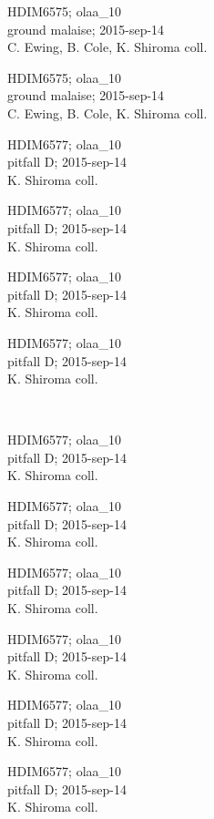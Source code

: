 \documentclass[2pt]{extarticle}
\begin{document}
\noindent
\parbox{0.16\textwidth}{\tiny \raggedright \rule[-0.3\baselineskip]{0pt}{10pt}HDIM6575; olaa\_10\\ ground malaise; 2015-sep-14\\ C. Ewing, B. Cole, K. Shiroma coll.}
\parbox{0.16\textwidth}{\tiny \raggedright \rule[-0.3\baselineskip]{0pt}{10pt}HDIM6575; olaa\_10\\ ground malaise; 2015-sep-14\\ C. Ewing, B. Cole, K. Shiroma coll.}
\parbox{0.16\textwidth}{\tiny \raggedright \rule[-0.3\baselineskip]{0pt}{10pt}HDIM6577; olaa\_10\\ pitfall D; 2015-sep-14\\ K. Shiroma coll.}
\parbox{0.16\textwidth}{\tiny \raggedright \rule[-0.3\baselineskip]{0pt}{10pt}HDIM6577; olaa\_10\\ pitfall D; 2015-sep-14\\ K. Shiroma coll.}
\parbox{0.16\textwidth}{\tiny \raggedright \rule[-0.3\baselineskip]{0pt}{10pt}HDIM6577; olaa\_10\\ pitfall D; 2015-sep-14\\ K. Shiroma coll.}
\parbox{0.16\textwidth}{\tiny \raggedright \rule[-0.3\baselineskip]{0pt}{10pt}HDIM6577; olaa\_10\\ pitfall D; 2015-sep-14\\ K. Shiroma coll.} \\ 
\vspace{0.001in} 

\noindent
\parbox{0.16\textwidth}{\tiny \raggedright \rule[-0.3\baselineskip]{0pt}{10pt}HDIM6577; olaa\_10\\ pitfall D; 2015-sep-14\\ K. Shiroma coll.}
\parbox{0.16\textwidth}{\tiny \raggedright \rule[-0.3\baselineskip]{0pt}{10pt}HDIM6577; olaa\_10\\ pitfall D; 2015-sep-14\\ K. Shiroma coll.}
\parbox{0.16\textwidth}{\tiny \raggedright \rule[-0.3\baselineskip]{0pt}{10pt}HDIM6577; olaa\_10\\ pitfall D; 2015-sep-14\\ K. Shiroma coll.}
\parbox{0.16\textwidth}{\tiny \raggedright \rule[-0.3\baselineskip]{0pt}{10pt}HDIM6577; olaa\_10\\ pitfall D; 2015-sep-14\\ K. Shiroma coll.}
\parbox{0.16\textwidth}{\tiny \raggedright \rule[-0.3\baselineskip]{0pt}{10pt}HDIM6577; olaa\_10\\ pitfall D; 2015-sep-14\\ K. Shiroma coll.}
\parbox{0.16\textwidth}{\tiny \raggedright \rule[-0.3\baselineskip]{0pt}{10pt}HDIM6577; olaa\_10\\ pitfall D; 2015-sep-14\\ K. Shiroma coll.} \\ 
\vspace{0.001in} 
\end{document}
